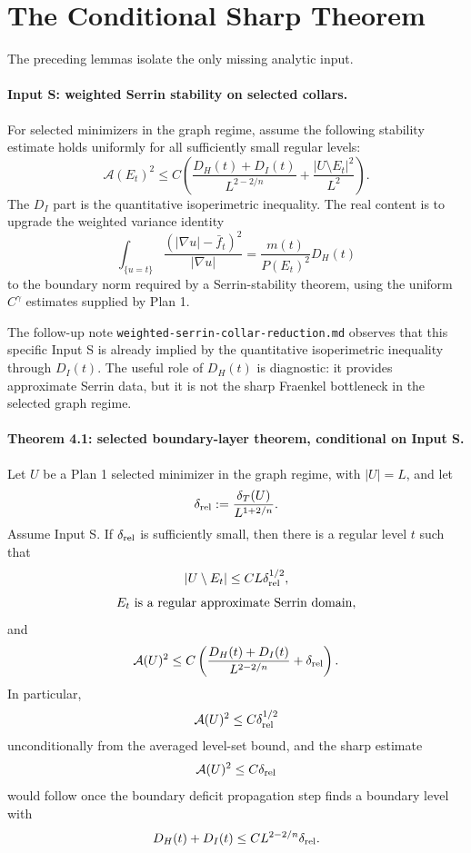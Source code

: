 \documentclass[11pt]{article}
\begin{document}
\section{The Conditional Sharp Theorem}

The preceding lemmas isolate the only missing analytic input.

\paragraph{Input S: weighted Serrin stability on selected collars.}
For selected minimizers in the graph regime, assume the following stability
estimate holds uniformly for all sufficiently small regular levels:
\[
\mathcal A(E_t)^2
\le
C\left(
\frac{D_H(t)+D_I(t)}{L^{2-2/n}}
+\frac{|U\setminus E_t|^2}{L^2}
\right).
\]
The \(D_I\) part is the quantitative isoperimetric inequality. The real content
is to upgrade the weighted variance identity
\[
\int_{\{u=t\}}
\frac{(|\nabla u|-\bar f_t)^2}{|\nabla u|}
=
\frac{m(t)}{P(E_t)^2}D_H(t)
\]
to the boundary norm required by a Serrin-stability theorem, using the uniform
\(C^\gamma\) estimates supplied by Plan 1.

The follow-up note \texttt{weighted-serrin-collar-reduction.md} observes that
this specific Input S is already implied by the quantitative isoperimetric
inequality through \(D_I(t)\). The useful role of \(D_H(t)\) is diagnostic: it
provides approximate Serrin data, but it is not the sharp Fraenkel bottleneck in
the selected graph regime.

\paragraph{Theorem 4.1: selected boundary-layer theorem, conditional on Input S.}
Let \(U\) be a Plan 1 selected minimizer in the graph regime, with
\(|U|=L\), and let
\[
\delta_{\rm rel}:=\frac{\delta_T(U)}{L^{1+2/n}}.
\]
Assume Input S. If \(\delta_{\rm rel}\) is sufficiently small, then there is a
regular level \(t\) such that
\[
|U\setminus E_t|\le C L\delta_{\rm rel}^{1/2},
\]
\[
E_t\hbox{ is a regular approximate Serrin domain},
\]
and
\[
\mathcal A(U)^2
\le
C\left(
\frac{D_H(t)+D_I(t)}{L^{2-2/n}}
+\delta_{\rm rel}
\right).
\]
In particular,
\[
\mathcal A(U)^2\le C\delta_{\rm rel}^{1/2}
\]
unconditionally from the averaged level-set bound, and the sharp estimate
\[
\mathcal A(U)^2\le C\delta_{\rm rel}
\]
would follow once the boundary deficit propagation step finds a boundary level
with
\[
D_H(t)+D_I(t)\le C L^{2-2/n}\delta_{\rm rel}.
\]
\end{document}
